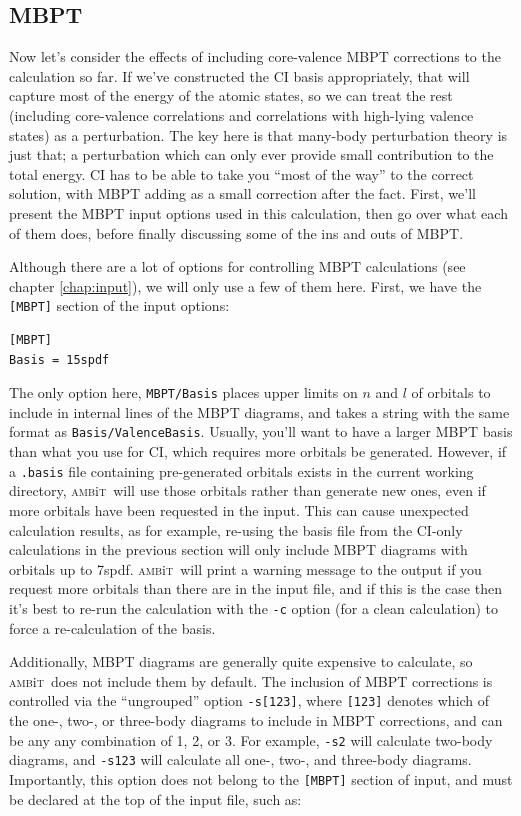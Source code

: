 \documentclass{report}
\newcommand{\ambit}{\textsc{amb}{\footnotesize i}\textsc{t}}
\begin{document}
\subsection{MBPT}

Now let's consider the effects of including core-valence MBPT corrections to the calculation so far. If 
we've constructed the CI basis appropriately, that will capture most of the energy of the atomic states,
so we can treat the rest (including core-valence correlations and correlations with high-lying valence 
states) as a perturbation. The key here is that many-body perturbation theory is just that; a 
perturbation which can only ever provide small contribution to the total energy. CI has to be able to 
take you ``most of the way'' to the correct solution, with MBPT adding as a small correction after the 
fact. First, we'll present the MBPT input options used in this calculation, then go over what each of 
them does, before finally discussing some of the ins and outs of MBPT.

Although there are a lot of options for controlling MBPT calculations (see chapter \ref{chap:input}), we
will only use a few of them here. First, we have the \texttt{[MBPT]} section of the input options:

\begin{verbatim}
[MBPT]
Basis = 15spdf
\end{verbatim}

The only option here, \texttt{MBPT/Basis} places upper limits on $n$ and $l$ of orbitals to include in
internal lines of the MBPT diagrams, and takes a string with the same format as
\texttt{Basis/ValenceBasis}. Usually, you'll want to have a larger MBPT basis than what
you use for CI, which requires more orbitals be generated. However, if a \texttt{.basis} file containing
pre-generated orbitals exists in the current working directory, \ambit\ will use those
orbitals rather than generate new ones, even if more orbitals have been requested in the
input. This can cause unexpected calculation results, as for example, re-using the basis
file from the CI-only calculations in the previous section will only include MBPT
diagrams with orbitals up to 7spdf. \ambit\ will print a warning message to the output if
you request more orbitals than there are in the input file, and if this is the case then
it's best to re-run the calculation with the \texttt{-c} option (for a clean calculation)
to force a re-calculation of the basis.

Additionally, MBPT diagrams are generally quite expensive to calculate, so \ambit\  does not include them
by default. The inclusion of MBPT corrections is controlled via the ``ungrouped'' option
\texttt{-s[123]}, where \texttt{[123]} denotes which of the one-, two-, or three-body diagrams to 
include in MBPT corrections, and can be any any combination of 1, 2, or 3. For example, \texttt{-s2} 
will calculate two-body diagrams, and \texttt{-s123} will calculate all one-, two-, and three-body 
diagrams. Importantly, this option does not belong to the \texttt{[MBPT]} section of input, and must be
declared at the top of the input file, such as:
\end{document}
